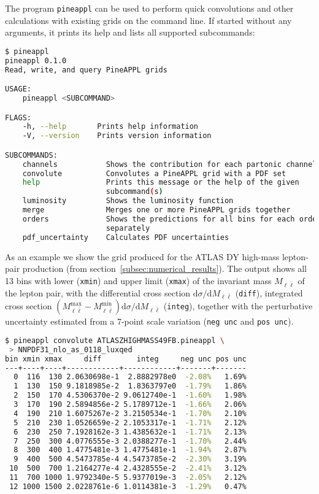 The program \texttt{pineappl} can be used to perform quick convolutions and other calculations with existing grids on the command line.
If started without any arguments, it prints its help and lists all supported subcommands:
\begin{lstlisting}[language=bash]
 $ pineappl
pineappl 0.1.0
Read, write, and query PineAPPL grids

USAGE:
    pineappl <SUBCOMMAND>

FLAGS:
    -h, --help       Prints help information
    -V, --version    Prints version information

SUBCOMMANDS:
    channels           Shows the contribution for each partonic channel
    convolute          Convolutes a PineAPPL grid with a PDF set
    help               Prints this message or the help of the given
                       subcommand(s)
    luminosity         Shows the luminosity function
    merge              Merges one or more PineAPPL grids together
    orders             Shows the predictions for all bins for each order
                       separately
    pdf_uncertainty    Calculates PDF uncertainties
\end{lstlisting}
As an example we show the grid produced for the ATLAS DY high-mass lepton-pair production (from section~\ref{subsec:numerical_results}).
The output shows all 13 bins with lower (\texttt{xmin}) and upper limit (\texttt{xmax}) of the invariant mass $M_{\ell \bar{\ell}}$ of the lepton pair, with the differential cross section $\mathrm{d} \sigma / \mathrm{d} M_{\ell \bar{\ell}}$ (\texttt{diff}), integrated cross section $(M_{\ell \bar{\ell}}^\mathrm{max} - M_{\ell \bar{\ell}}^\mathrm{min}) \mathrm{d} \sigma / \mathrm{d} M_{\ell \bar{\ell}}$ (\texttt{integ}), together with the perturbative uncertainty estimated from a 7-point scale variation (\texttt{neg unc} and \texttt{pos unc}).
\begin{lstlisting}[language=bash]
 $ pineappl convolute ATLASZHIGHMASS49FB.pineappl \
 > NNPDF31_nlo_as_0118_luxqed
bin xmin xmax     diff        integ     neg unc pos unc
---+----+----+------------+------------+-------+-------
  0  116  130 2.0630698e-1  2.8882978e0  -2.08%   1.69%
  1  130  150 9.1818985e-2  1.8363797e0  -1.79%   1.86%
  2  150  170 4.5306370e-2 9.0612740e-1  -1.60%   1.98%
  3  170  190 2.5894856e-2 5.1789712e-1  -1.66%   2.06%
  4  190  210 1.6075267e-2 3.2150534e-1  -1.70%   2.10%
  5  210  230 1.0526659e-2 2.1053317e-1  -1.71%   2.12%
  6  230  250 7.1928162e-3 1.4385632e-1  -1.71%   2.13%
  7  250  300 4.0776555e-3 2.0388277e-1  -1.70%   2.44%
  8  300  400 1.4775481e-3 1.4775481e-1  -1.94%   2.87%
  9  400  500 4.5473785e-4 4.5473785e-2  -2.30%   3.19%
 10  500  700 1.2164277e-4 2.4328555e-2  -2.41%   3.12%
 11  700 1000 1.9792340e-5 5.9377019e-3  -2.05%   2.12%
 12 1000 1500 2.0228761e-6 1.0114381e-3  -1.29%   0.47%
\end{lstlisting}

